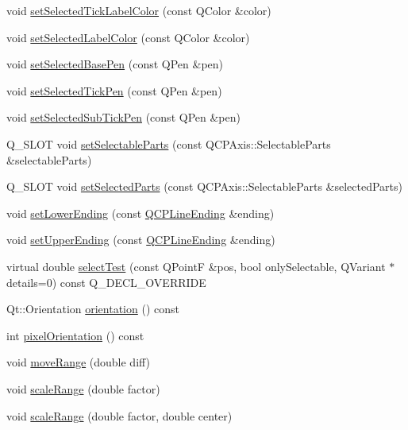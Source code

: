 \begin{DoxyCompactItemize}
void \hyperlink{classQCPAxis_a9bdbf5e63ab15187f3a1de9440129227}{set\+Selected\+Tick\+Label\+Color} (const Q\+Color \&color)
\item 
void \hyperlink{classQCPAxis_a5d502dec597c634f491fdd73d151c72d}{set\+Selected\+Label\+Color} (const Q\+Color \&color)
\item 
void \hyperlink{classQCPAxis_aeb917a909215605b95ef2be843de1ee8}{set\+Selected\+Base\+Pen} (const Q\+Pen \&pen)
\item 
void \hyperlink{classQCPAxis_a8360502685eb782edbf04019c9345cdc}{set\+Selected\+Tick\+Pen} (const Q\+Pen \&pen)
\item 
void \hyperlink{classQCPAxis_a2a00a7166600155eac26843132eb9576}{set\+Selected\+Sub\+Tick\+Pen} (const Q\+Pen \&pen)
\item 
Q\+\_\+\+S\+L\+OT void \hyperlink{classQCPAxis_a513f9b9e326c505d9bec54880031b085}{set\+Selectable\+Parts} (const Q\+C\+P\+Axis\+::\+Selectable\+Parts \&selectable\+Parts)
\item 
Q\+\_\+\+S\+L\+OT void \hyperlink{classQCPAxis_ab9d7a69277dcbed9119b3c1f25ca19c3}{set\+Selected\+Parts} (const Q\+C\+P\+Axis\+::\+Selectable\+Parts \&selected\+Parts)
\item 
void \hyperlink{classQCPAxis_a08af1c72db9ae4dc8cb8a973d44405ab}{set\+Lower\+Ending} (const \hyperlink{classQCPLineEnding}{Q\+C\+P\+Line\+Ending} \&ending)
\item 
void \hyperlink{classQCPAxis_a69119b892fc306f651763596685aa377}{set\+Upper\+Ending} (const \hyperlink{classQCPLineEnding}{Q\+C\+P\+Line\+Ending} \&ending)
\item 
virtual double \hyperlink{classQCPAxis_a63b7103c57fe9acfbce164334ea837f8}{select\+Test} (const Q\+PointF \&pos, bool only\+Selectable, Q\+Variant $\ast$details=0) const Q\+\_\+\+D\+E\+C\+L\+\_\+\+O\+V\+E\+R\+R\+I\+DE
\item 
Qt\+::\+Orientation \hyperlink{classQCPAxis_ab988ef4538e2655bb77bd138189cd42e}{orientation} () const
\item 
int \hyperlink{classQCPAxis_a45c45bed7e5666683b8d56afa66fa51f}{pixel\+Orientation} () const
\item 
void \hyperlink{classQCPAxis_a18f3a68f2b691af1fd34b6593c886630}{move\+Range} (double diff)
\item 
void \hyperlink{classQCPAxis_a31d18ddf3a4f21ceb077db8ae5b69856}{scale\+Range} (double factor)
\item 
void \hyperlink{classQCPAxis_a7072ff96fe690148f1bbcdb4f773ea1c}{scale\+Range} (double factor, double center)
\item 

\end{DoxyCompactItemize}
